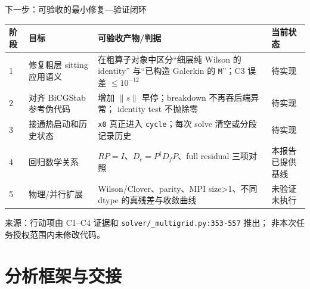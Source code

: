 \documentclass[UTF8,aspectratio=169,11pt]{ctexbeamer}
\newcommand{\source}[1]{%
  \vspace{0.06em}\par{\raggedright\scriptsize\color{muted}来源：#1\par}}
\newcommand{\pathref}[1]{\nolinkurl{#1}}
\newcommand{\unverified}{\textcolor{warn}{未验证}}
\begin{document}
\begin{frame}[t]{下一步：可验收的最小修复—验证闭环}
  \begin{center}
    \scriptsize
    \begin{tabular}{@{}P{0.07\textwidth}P{0.25\textwidth}P{0.46\textwidth}P{0.13\textwidth}@{}}
      \toprule
      阶段 & 目标 & 可验收产物/判据 & 当前状态 \\
       & 修复粗层 sitting 应用语义 & 在粗算子对象中区分“细层纯 Wilson 的 identity”
      与“已构造 Galerkin 的 \texttt{M}”；C3 误差 $\le10^{-12}$ & 待实现 \\
      2 & 对齐 BiCGStab 参考伪代码 & 增加 $\|s\|$ 早停；breakdown 不再吞后端异常；
      identity test 不抛除零 & 待实现 \\
      3 & 接通热启动和历史状态 & \texttt{x0} 真正进入 \texttt{cycle}；每次 solve 清空或分段记录历史 & 待实现 \\
      4 & 回归数学关系 & $RP=I$、$D_c=P^\dagger D_fP$、full residual 三项对照 & 本报告已提供基线 \\
      5 & 物理/并行扩展 & Wilson/Clover、parity、MPI size>1、不同 dtype 的真残差与收敛曲线 & \unverified{} 未执行 \\
      \bottomrule
    \end{tabular}
  \end{center}
  \source{行动项由 C1--C4 证据和 \pathref{solver/_multigrid.py:353-557} 推出；
  非本次任务授权范围内未修改代码。}
\end{frame}

\section{分析框架与交接}
\end{document}
